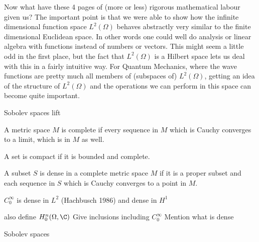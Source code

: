 \begin{rem}
	Now what have these 4 pages of (more or less) rigorous mathematical labour given us?
	The important point is that we were able to show how the infinite dimensional function space $L^2(\Omega)$ behaves abstractly very similar to the finite dimensional Euclidean space.
	In other words one could well do analysis or linear algebra with functions instead of numbers or vectors. 
	This might seem a little odd in the first place, but the fact that $L^2(\Omega)$ is a Hilbert space lets us deal with this in a fairly intuitive way.
	For Quantum Mechanics, where the wave functions are pretty much all members of (subspaces of) $L^2(\Omega)$, getting an idea of the structure of $L^2(\Omega)$ and the operations we can perform in this space can become quite important.
\end{rem}





Sobolev spaces lift 



\begin{defn}
\end{defn}

\begin{defn}
	A metric space $M$ is complete if every sequence in $M$
	which is Cauchy converges to a limit, which is in $M$ as well.
\end{defn}

\begin{defn}
	A set is compact if it is bounded and complete.
\end{defn}

\begin{defn}
	A subset $S$ is dense in a complete metric space $M$ if it is a proper subset
	and each sequence in $S$ which is Cauchy converges to a point in $M$.
\end{defn}

$C^\infty_0$ is dense in $L^2$ (Hachbusch 1986)
and dense in $H^1$

also define $H_0^n(\Omega, \C)$
Give inclusions including $C^\infty_0$
Mention what is dense

Sobolev spaces
